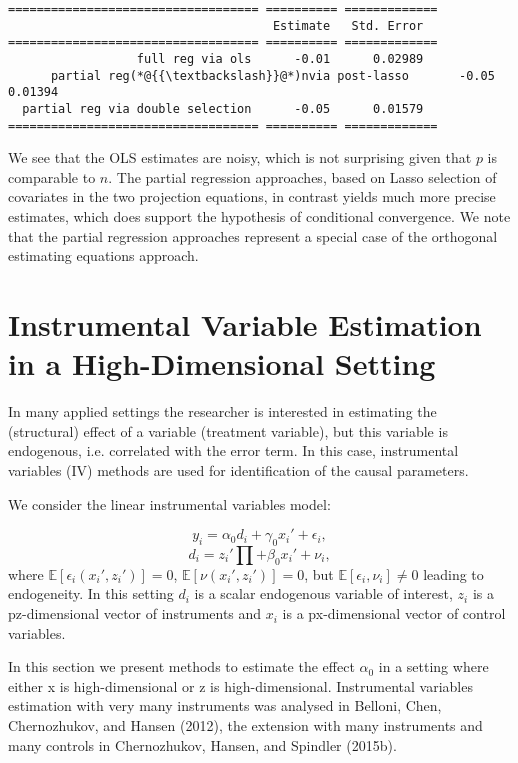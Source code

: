\documentclass[12pt,a4paper]{article}
\begin{document}
\begin{lstlisting}
=================================== ========== =============
                                     Estimate   Std. Error
=================================== ========== =============
                  full reg via ols      -0.01      0.02989
      partial reg(*@{{\textbackslash}}@*)nvia post-lasso       -0.05      0.01394
  partial reg via double selection      -0.05      0.01579
=================================== ========== =============
\end{lstlisting}


We see that the OLS estimates are noisy, which is not surprising given that $p$ is comparable to $n$. The partial regression approaches, based on Lasso selection of covariates in the two projection equations, in contrast yields much more precise estimates, which does support the hypothesis of conditional convergence. We note that the partial regression approaches represent a special case of the orthogonal estimating equations approach.

\section{Instrumental Variable Estimation in a High-Dimensional Setting}
In many applied settings the researcher is interested in estimating the (structural) effect of a variable (treatment variable), but this variable is endogenous, i.e. correlated with the error term. In this case, instrumental variables (IV) methods are used for identification of the causal parameters.

We consider the linear instrumental variables model:

\[
y_i = \alpha_0 d_i + \gamma_0 x_i' + \epsilon_i,
\]
\[
d_i = z_i'\prod + \beta_0 x_i' + \nu_i,
\]
where $\mathbb E\left[\epsilon_i(x_i', z_i')\right] = 0$, $\mathbb E\left[\nu(x_i', z_i')\right] = 0$, but $\mathbb E[\epsilon_i, \nu_i] \neq 0$ leading to endogeneity. In this setting $d_i$ is a scalar endogenous variable of interest, $z_i$ is a pz-dimensional vector of instruments and $x_i$ is a px-dimensional vector of control variables.

In this section we present methods to estimate the effect $\alpha_0$ in a setting where either x is high-dimensional or z is high-dimensional. Instrumental variables estimation with very many instruments was analysed in Belloni, Chen, Chernozhukov, and Hansen (2012), the extension with many instruments and many controls in Chernozhukov, Hansen, and Spindler (2015b).
\end{document}

